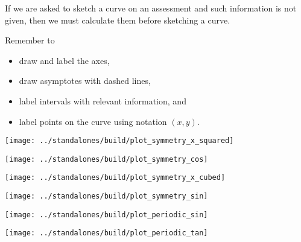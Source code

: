 \documentclass[../main.tex]{subfiles}
\begin{document}
\faExclamationTriangle{} 
If we are asked to sketch a curve on an assessment and such information is not given, then we must calculate them before sketching a curve. 

\bigskip

Remember to
\begin{itemize}
  \item draw and label the axes,
  \item draw asymptotes with dashed lines,
  \item label intervals with relevant information, and
  \item label points on the curve using notation \((x,y)\).
\end{itemize}

\clearpage
{}

\vfill


\vfill
{}
\clearpage

\begin{minipage}{.45\textwidth}
  \centering
  \texttt{[image: ../standalones/build/plot\_symmetry\_x\_squared]}
\end{minipage}
\hfill
\begin{minipage}{.45\textwidth}
  \centering
  \texttt{[image: ../standalones/build/plot\_symmetry\_cos]}
\end{minipage}
\vfill

\begin{minipage}{.45\textwidth}
  \centering
  \texttt{[image: ../standalones/build/plot\_symmetry\_x\_cubed]}
\end{minipage}
\hfill
\begin{minipage}{.45\textwidth}
  \centering
  \texttt{[image: ../standalones/build/plot\_symmetry\_sin]}
\end{minipage}
\vfill

\begin{minipage}{.45\textwidth}
  \centering
  \texttt{[image: ../standalones/build/plot\_periodic\_sin]}
\end{minipage}
\hfill
\begin{minipage}{.45\textwidth}
  \centering
  \texttt{[image: ../standalones/build/plot\_periodic\_tan]}
\end{minipage}
\vfill
\end{document}

